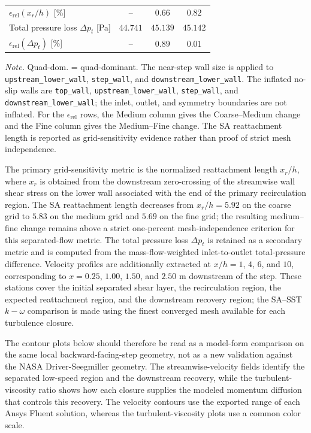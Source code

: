 \begin{table}[htbp]
\begin{tabular*}{\textwidth}{@{\extracolsep{\fill}}lccc@{}}
		$\epsilon_{\mathrm{rel}}(x_r/h)$ [\%] & -- & $0.66$& $0.82$ \\
		Total pressure loss $\Delta p_t$ [Pa] & $44.741$ & $45.139$ & $45.142$ \\
		$\epsilon_{\mathrm{rel}}(\Delta p_t)$ [\%] & -- & $0.89$ & $0.01$ \\
		\hline
	\end{tabular*}
	\vspace{2pt}
	\begin{minipage}{0.98\textwidth}
			\scriptsize \textit{Note.} Quad-dom. = quad-dominant. The near-step wall size is applied to \texttt{upstream\_lower\_wall}, \texttt{step\_wall}, and \texttt{downstream\_lower\_wall}. The inflated no-slip walls are \texttt{top\_wall}, \texttt{upstream\_lower\_wall}, \texttt{step\_wall}, and \texttt{downstream\_lower\_wall}; the inlet, outlet, and symmetry boundaries are not inflated. For the $\epsilon_{\mathrm{rel}}$ rows, the Medium column gives the Coarse--Medium change and the Fine column gives the Medium--Fine change. The SA reattachment length is reported as grid-sensitivity evidence rather than proof of strict mesh independence.
	\end{minipage}
\end{table}

The primary grid-sensitivity metric is the normalized reattachment length $x_r/h$, where $x_r$ is obtained from the downstream zero-crossing of the streamwise wall shear stress on the lower wall associated with the end of the primary recirculation region. The SA reattachment length decreases from $x_r/h=5.92$ on the coarse grid to $5.83$ on the medium grid and $5.69$ on the fine grid; the resulting medium--fine change remains above a strict one-percent mesh-independence criterion for this separated-flow metric. The total pressure loss $\Delta p_t$ is retained as a secondary metric and is computed from the mass-flow-weighted inlet-to-outlet total-pressure difference. Velocity profiles are additionally extracted at $x/h=1$, $4$, $6$, and $10$, corresponding to $x=0.25$, $1.00$, $1.50$, and $2.50$ m downstream of the step. These stations cover the initial separated shear layer, the recirculation region, the expected reattachment region, and the downstream recovery region; the SA--SST $k-\omega$ comparison is made using the finest converged mesh available for each turbulence closure.



\FloatBarrier

The contour plots below should therefore be read as a model-form comparison on the same local backward-facing-step geometry, not as a new validation against the NASA Driver-Seegmiller geometry. The streamwise-velocity fields identify the separated low-speed region and the downstream recovery, while the turbulent-viscosity ratio shows how each closure supplies the modeled momentum diffusion that controls this recovery. The velocity contours use the exported range of each Ansys Fluent solution, whereas the turbulent-viscosity plots use a common color scale.

